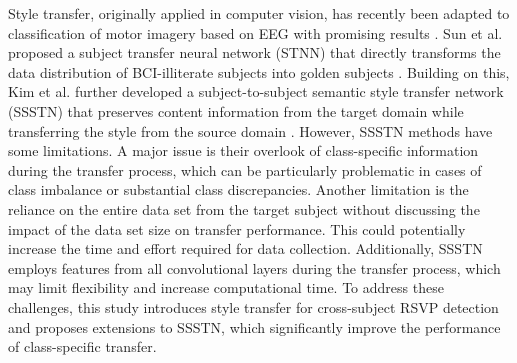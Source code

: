 Style transfer, originally applied in computer vision, has recently been adapted to classification of motor imagery based on EEG with promising results \cite{sun2022golden, kim2023bridging}. Sun et al. proposed a subject transfer neural network (STNN) that directly transforms the data distribution of BCI-illiterate subjects into golden subjects \cite{sun2022golden}. Building on this, Kim et al. further developed a subject-to-subject semantic style transfer network (SSSTN) that preserves content information from the target domain while transferring the style from the source domain \cite{kim2023bridging}. However, SSSTN methods have some limitations. A major issue is their overlook of class-specific information during the transfer process, which can be particularly problematic in cases of class imbalance or substantial class discrepancies. Another limitation is the reliance on the entire data set from the target subject without discussing the impact of the data set size on transfer performance. This could potentially increase the time and effort required for data collection. Additionally, SSSTN employs features from all convolutional layers during the transfer process, which may limit flexibility and increase computational time. To address these challenges, this study introduces style transfer for cross-subject RSVP detection and proposes extensions to SSSTN, which significantly improve the performance of class-specific transfer.